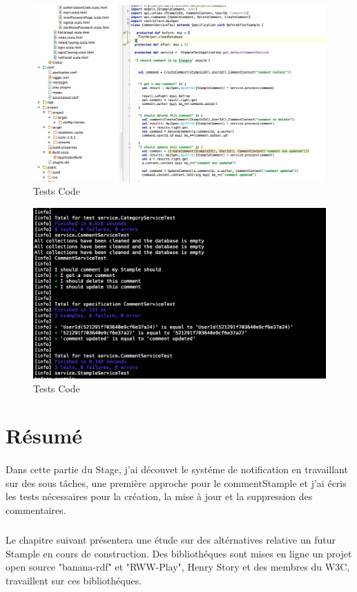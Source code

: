 \begin{figure}[H]
        \centering
                \centering
                \includegraphics[width=\textwidth]{test.png}
               \caption{Tests Code}
		\label{fig:Test Code}
\end{figure}
\begin{figure}[H]
        \centering
                \centering
                \includegraphics[width=\textwidth]{code.png}
               \caption{Tests Code}
		\label{fig:Test Code}
\end{figure}
\section{Résumé}
\paragraph{}
Dans cette partie du Stage, j'ai découvet le systéme de notification en travaillant sur des sous tâches, une première approche pour le commentStample et j'ai écris les tests nécessaires pour la création, la mise à jour et la suppression des commentaires.
\subparagraph{}
Le chapitre suivant présentera une étude sur des altérnatives relative un futur Stample en cours de construction.
Des bibliothéques sont mises en ligne un projet open source "banana-rdf" et "RWW-Play", Henry Story et des membres du W3C, travaillent sur ces bibliothéques.